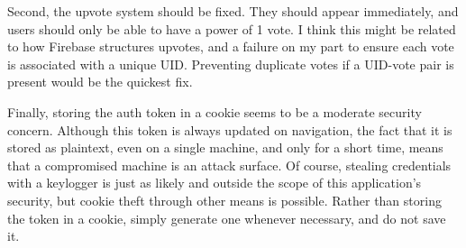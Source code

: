 Second, the upvote system should be fixed. They should appear immediately, and users should only be able to have a power of 1 vote. I think this might be related to how Firebase structures upvotes, and a failure on my part to ensure each vote is associated with a unique UID. Preventing duplicate votes if a UID-vote pair is present would be the quickest fix.

Finally, storing the auth token in a cookie seems to be a moderate security concern. Although this token is always updated on navigation, the fact that it is stored as plaintext, even on a single machine, and only for a short time, means that a compromised machine is an attack surface. Of course, stealing credentials with a keylogger is just as likely and outside the scope of this application's security, but cookie theft through other means is possible. Rather than storing the token in a cookie, simply generate one whenever necessary, and do not save it.